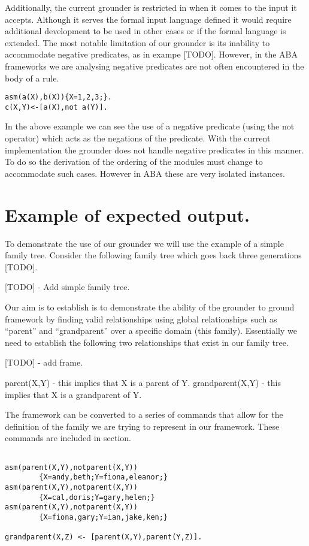 Additionally, the current grounder is restricted in when it comes to the input it accepts. Although it serves the formal input language defined it would require additional development to be used in other cases or if the formal language is extended. The most notable limitation of our grounder is its inability to accommodate negative predicates, as in exampe [TODO]. However, in the ABA frameworks we are analysing negative predicates are not often encountered in the body of a rule.

\begin{Verbatim}[frame=single]
asm(a(X),b(X)){X=1,2,3;}.
c(X,Y)<-[a(X),not a(Y)].
\end{Verbatim}

In the above example we can see the use of a negative predicate (using the not operator) which acts as the negations of the predicate. With the current implementation the grounder does not handle negative predicates in this manner. To do so the derivation of the ordering of the modules must change to accommodate such cases. However in ABA these are very isolated instances.

\section{Example of expected output.}

To demonstrate the use of our grounder we will use the example of a simple family tree. Consider the following family tree which goes back three generations [TODO].

[TODO] - Add simple family tree.

Our aim is to establish is to demonstrate the ability of the grounder to ground framework by finding valid relationships using global relationships such as ``parent'' and ``grandparent'' over a specific domain (this family). Essentially we need to establish the following two relationships that exist in our family tree.

[TODO] - add frame.

parent(X,Y) - this implies that X is a parent of Y.
grandparent(X,Y) - this implies that X is a grandparent of Y.

The framework can be converted to a series of commands that allow for the definition of the family we are trying to represent in our framework. These commands are included in section.

\begin{Verbatim}[frame=single]

asm(parent(X,Y),notparent(X,Y))
		{X=andy,beth;Y=fiona,eleanor;}
asm(parent(X,Y),notparent(X,Y))
		{X=cal,doris;Y=gary,helen;}
asm(parent(X,Y),notparent(X,Y))
		{X=fiona,gary;Y=ian,jake,ken;}

grandparent(X,Z) <- [parent(X,Y),parent(Y,Z)].

\end{Verbatim}

